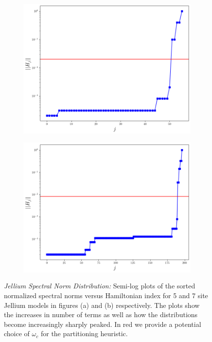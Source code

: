 \begin{figure}[h!]
    \centering
        \begin{subfigure}[b]{.49\textwidth}
            \includegraphics[width=1\textwidth]{composite_numerics/J5dist.png}
            \caption{}
        \end{subfigure}
        \begin{subfigure}[b]{.49\textwidth}
            \includegraphics[width=1\textwidth]{composite_numerics/J7dist.png}
            \caption{}
        \end{subfigure}
        \caption{\textit{Jellium Spectral Norm Distribution:} Semi-log plots of the sorted normalized spectral norms versus Hamiltonian index for 5 and 7 site Jellium models in figures (a) and (b) respectively. The plots show the increases in number of terms as well as how the distributions become increasingly sharply peaked. In red we provide a potential choice of $\omega_c$ for the partitioning heuristic.} \label{fig:Jelliumspec}
\end{figure}
\FloatBarrier

